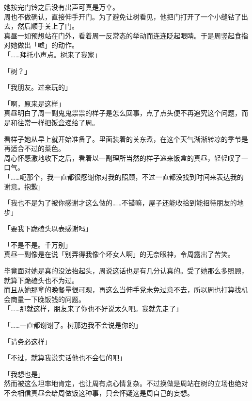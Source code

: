她按完门铃之后没有出声可真是万幸。\\

周也不做确认，直接伸手开门。为了避免让树看见，他把门打开了一个小缝钻了出去，然后顺手关上了门。\\

真昼一如预想站在门外，看着周一反常态的举动而连连眨起眼睛。于是周竖起食指对她做出「嘘」的动作。\\

「……拜托小声点。树来了我家」

「树？」

「我朋友。过来玩的」

「啊，原来是这样」\\

真昼明白了周一副鬼鬼祟祟的样子是怎么回事，点了点头便不再追究这个问题，而是和往常一样把饭盒递给了周。

看样子她从早上就开始准备了。里面装着的关东煮，在这个天气渐渐转凉的季节是再适合不过的菜色。\\

周心怀感激地收下之后，看着以一副理所当然的样子递来饭盒的真昼，轻轻叹了一口气。\\

「……呃那个，我一直都很感谢你对我的照顾，不过一直都没找到时间来表达我的谢意。抱歉」

「我也不是为了被你感谢才这么做的……不错嘛，屋子还能收拾到能招待朋友的地步」

「要我下跪磕头以表感谢吗」

「不是不是。千万别」\\

真昼一副像是在说「别弄得我像个坏女人啊」的无奈眼神，令周露出了苦笑。

毕竟面对她是真的没法抬起头，周说这话也是有几分认真的。受了她那么多照顾，就算下跪磕头也不为过。\\

而且从她那拿的晚餐量很可观，再这么当伸手党未免过意不去，所以周也打算找机会商量一下晚饭钱的问题。\\

「……那就这样，朋友来了你也不好说太久吧。我就先走了」

「……一直都谢谢了。树那边我不会说是你的」

「请务必这样」

「不过，就算我说实话他也不会信的吧」

「我想也是」\\

然而被这么坦率地肯定，也让周有点心情复杂。不过换做是周站在树的立场也绝对不会相信真昼会给周做饭这种事，只会怀疑这是周自己的妄想。

